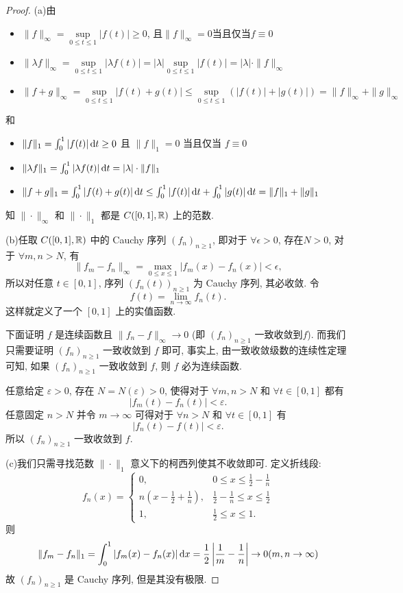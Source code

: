 \begin{proof}
(a)由\begin{itemize}
\item $\|f\|_{\infty}=\sup\limits_{0\leq t\leq 1}|f(t)|\geq 0$, 且$\|f\|_{\infty}=0$当且仅当$f\equiv 0$
\item $\|\lambda f\|_{\infty}=\sup\limits_{0\leq t\leq 1}|\lambda f(t)|=|\lambda|\sup\limits_{0\leq t\leq 1}|f(t)|=|\lambda|\cdot\|f\|_{\infty}$
\item $\|f+g\|_{\infty}=\sup\limits_{0\leq t\leq 1}|f(t)+g(t)|\leq \sup\limits_{0\leq t\leq 1}(|f(t)|+|g(t)|)=\|f\|_{\infty}+\|g\|_{\infty}$
\end{itemize}
和
\begin{itemize}
\item $\|f\|_1=\int_0^1|f(t)|\mathop{}\!\mathrm{d} t\geq 0$ 且 $\|f\|_1=0$ 当且仅当 $f\equiv 0$
\item $\|\lambda f\|_1=\int_0^1 |\lambda f(t)|\mathop{}\!\mathrm{d} t=|\lambda|\cdot\|f\|_1$
\item $\|f+g\|_1=\int_0^1 |f(t)+g(t)|\mathop{}\!\mathrm{d} t\leq\int_0^1|f(t)|\mathop{}\!\mathrm{d} t+\int_0^1|g(t)|\mathop{}\!\mathrm{d} t=\|f\|_1+\|g\|_1$
\end{itemize}
知 $\|\cdot\|_{\infty}$ 和 $\|\cdot\|_1$ 都是 $C([0,1],\mathbb{R})$ 上的范数.

(b)任取 $C([0,1],\mathbb{R})$ 中的 Cauchy 序列 $(f_n)_{n\geq 1}$, 
即对于 $\forall\epsilon>0$, 存在$N>0$, 对于 $\forall m,n>N$, 有
\[\|f_m-f_n\|_{\infty}=\max_{0\leq x\leq 1}|f_m(x)-f_n(x)|<\epsilon,\]
所以对任意 $t\in[0,1]$, 序列 $(f_n(t))_{n\geq 1}$ 为 Cauchy 序列, 其必收敛. 令
\[f(t)=\lim_{n\to\infty}f_n(t).\]
这样就定义了一个 $[0,1]$ 上的实值函数. 

下面证明 $f$ 是连续函数且 $\|f_n-f\|_{\infty}\to 0$ (即 $(f_n)_{n\geq 1}$ 一致收敛到$f$). 
而我们只需要证明 $(f_n)_{n\geq 1}$ 一致收敛到 $f$ 即可,
事实上, 由一致收敛级数的连续性定理可知, 如果 $(f_n)_{n\geq 1}$ 一致收敛到 $f$, 则
$f$ 必为连续函数.

任意给定 $\varepsilon>0$, 存在 $N=N(\varepsilon)>0$, 
使得对于 $\forall m,n>N$ 和 $\forall t\in[0,1]$ 都有 
\[|f_m(t)-f_n(t)|<\varepsilon.\]
任意固定 $n>N$ 并令 $m\to\infty$ 可得对于 $\forall n>N$ 和 $\forall t\in[0,1]$ 有
\[|f_n(t)-f(t)|<\varepsilon.\]
所以 $(f_n)_{n\geq 1}$ 一致收敛到 $f$.

(c)我们只需寻找范数 $\|\cdot\|_1$ 意义下的柯西列使其不收敛即可. 定义折线段:
\[f_n(x)=\begin{cases}
0, & 0\leq x\leq\frac{1}{2}-\frac{1}{n} \\
n\left(x-\frac{1}{2}+\frac{1}{n}\right), & \frac{1}{2}-\frac{1}{n}\leq x\leq\frac{1}{2} \\
1, & \frac{1}{2}\leq x\leq 1.
\end{cases}\]
则
\[\|f_m-f_n\|_1=\int_0^1|f_m(x)-f_n(x)|\mathop{}\!\mathrm{d} x=\frac{1}{2}\left\lvert\frac{1}{m}-\frac{1}{n}\right\rvert\to 0(m,n\to\infty)\]
故 $(f_n)_{n\geq 1}$ 是 Cauchy 序列, 但是其没有极限.
\end{proof}

